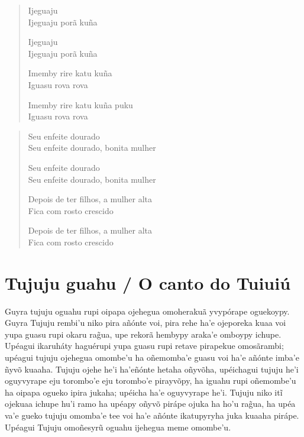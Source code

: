 \begin{verse}
Ijeguaju\\
Ijeguaju porã kuña

Ijeguaju\\
Ijeguaju porã kuña

Imemby rire katu kuña\\
Iguasu rova rova

Imemby rire katu kuña puku\\
Iguasu rova rova
\end{verse}

\begin{verse}
Seu enfeite dourado\\
Seu enfeite dourado, bonita mulher

Seu enfeite dourado\\
Seu enfeite dourado, bonita mulher

Depois de ter filhos, a mulher alta\\
Fica com rosto crescido

Depois de ter filhos, a mulher alta\\
Fica com rosto crescido
\end{verse}

\chapter{Tujuju guahu / O canto do Tuiuiú}

Guyra tujuju oguahu rupi oipapa ojehegua omoherakuã yvypórape oguekoypy.
Guyra Tujuju rembi'u niko pira añónte voi, pira rehe ha'e ojeporeka kuaa
voi yupa guasu rupi okaru rag̃ua, upe rekorã hembypy araka'e omboypy
ichupe. Upéagui ikaruháty haguérupi yupa guasu rupi retave pirapekue
omosãrambi; upéagui tujuju ojehegua omombe'u ha oñemomba'e guasu voi
ha'e añónte imba'e ñyvõ kuaaha. Tujuju ojehe he'i ha'eñónte hetaha
oñyvõha, upéichagui tujuju he'i oguyvyrape eju torombo'e eju torombo'e
pirayvõpy, ha iguahu rupi oñemombe'u ha oipapa ogueko ipira jukaha;
upéicha ha'e oguyvyrape he'i. Tujuju niko itĩ ojekuaa ichupe hu'i ramo
ha upéapy oñyvõ pirápe ojuka ha ho'u rag̃ua, ha upéa va'e gueko tujuju
omomba'e tee voi ha'e añónte ikatupyryha juka kuaaha pirápe. Upéagui
Tujuju omoñesyrũ oguahu ijehegua meme omombe'u.

